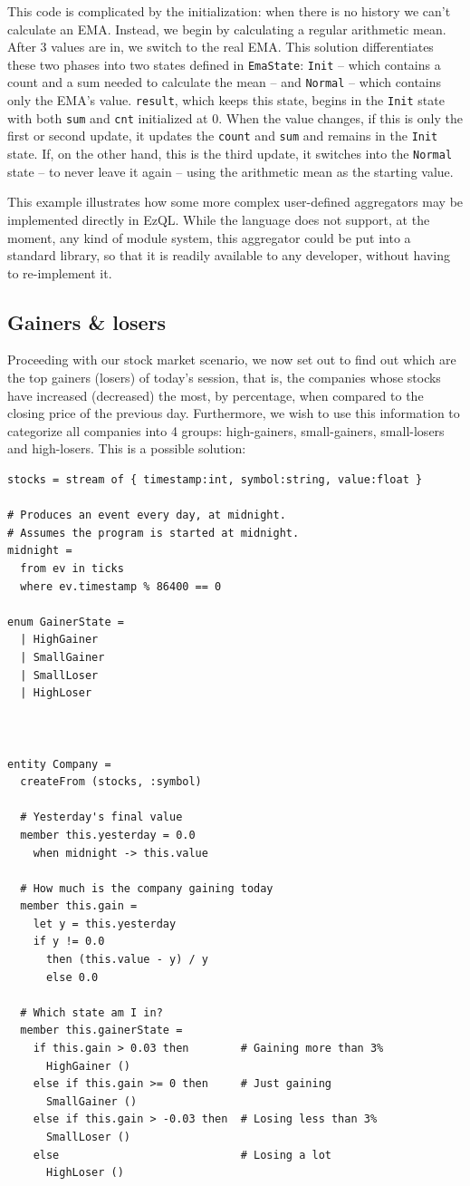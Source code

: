 This code is complicated by the initialization: when there is no
history we can't calculate an EMA. Instead, we begin by calculating a
regular arithmetic mean. After 3 values are in, we switch to the real
EMA. This solution differentiates these two phases into two states
defined in \verb=EmaState=: \verb=Init= -- which contains a count and
a sum needed to calculate the mean -- and \verb=Normal= -- which
contains only the EMA's value. \verb=result=, which keeps this state,
begins in the \verb=Init= state with both \verb=sum= and \verb=cnt=
initialized at 0. When the value changes, if this is only the first or
second update, it updates the \verb=count= and \verb=sum= and remains
in the \verb=Init= state. If, on the other hand, this is the third
update, it switches into the \verb=Normal= state -- to never leave it
again -- using the arithmetic mean as the starting value.

This example illustrates how some more complex user-defined
aggregators may be implemented directly in EzQL. While the language
does not support, at the moment, any kind of module system, this
aggregator could be put into a standard library, so that it is readily
available to any developer, without having to re-implement it.

\subsection{Gainers \& losers}

Proceeding with our stock market scenario, we now set out to find out
which are the top gainers (losers) of today's session, that is, the
companies whose stocks have increased (decreased) the most, by
percentage, when compared to the closing price of the previous
day. Furthermore, we wish to use this information to categorize all
companies into 4 groups: high-gainers, small-gainers, small-losers and
high-losers. This is a possible solution:

\begin{lstlisting}
stocks = stream of { timestamp:int, symbol:string, value:float }

# Produces an event every day, at midnight.
# Assumes the program is started at midnight.
midnight =
  from ev in ticks
  where ev.timestamp % 86400 == 0

enum GainerState =
  | HighGainer
  | SmallGainer
  | SmallLoser
  | HighLoser



entity Company =
  createFrom (stocks, :symbol)

  # Yesterday's final value
  member this.yesterday = 0.0
    when midnight -> this.value

  # How much is the company gaining today
  member this.gain =
    let y = this.yesterday
    if y != 0.0
      then (this.value - y) / y
      else 0.0

  # Which state am I in?
  member this.gainerState =
    if this.gain > 0.03 then        # Gaining more than 3%
      HighGainer ()
    else if this.gain >= 0 then     # Just gaining
      SmallGainer ()
    else if this.gain > -0.03 then  # Losing less than 3%
      SmallLoser ()
    else                            # Losing a lot
      HighLoser ()
\end{lstlisting}

